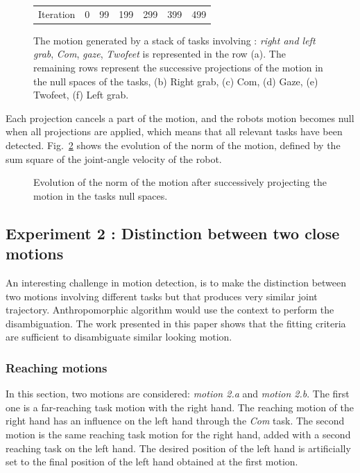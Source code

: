 \documentclass[letterpaper, 10pt, conference]{ieeeconf}      %
\begin{document}
\begin{figure}[t]
\begin{tabular}{c@{}c@{}c@{}c@{}c@{}c@{}c}
\\
Iteration & 0 & 99 & 199 & 299 & 399 & 499\\
\end{tabular}
\caption{The motion generated by a stack of tasks involving :
\emph{right and left grab}, \emph{Com}, \emph{gaze}, \emph{Twofeet} is represented in the row (a).
The remaining rows represent the successive projections of the motion in the null spaces of the tasks,
(b) Right grab, (c) Com, (d) Gaze, (e) Twofeet, (f) Left grab.}
\label{fig:snapshotXpqdot}
\end{figure}
Each projection cancels a part of the motion, and the robots motion becomes null when all
projections are applied,
which means that all relevant tasks have been detected.
Fig.~\ref{fig:xp3Pqdot} shows the evolution of the norm of the motion,
defined by the sum square of the joint-angle velocity of the robot.
\begin{figure}[t]
\begin{center}
\resizebox{.48\textwidth}{!} {
      
    }
\end{center}
\caption{Evolution of the norm of the motion after successively projecting the motion in the
	tasks null spaces.}
\label{fig:xp3Pqdot}
\end{figure}

\subsection{Experiment 2 : Distinction between two close motions}
\label{sec:distinc}
An interesting challenge in motion detection,
is to make the distinction between two motions
involving different tasks but that produces very similar joint trajectory.
Anthropomorphic algorithm would use the context to perform the disambiguation.
The work presented in this paper shows that the fitting criteria
are sufficient to disambiguate similar looking motion.

\subsubsection{Reaching motions}
\label{sec:distinc1}
In this section, two motions are considered: \emph{motion 2.a} and \emph{motion 2.b}.
The first one is a far-reaching task motion with the right hand.
The reaching motion of the right hand has an influence on the left hand through the \emph{Com} task.
The second motion is the same reaching task motion for the right hand, added with a
second reaching task on the left hand. The desired position of the left
hand is artificially set to the final position of the left hand obtained at the first motion.
\end{document}
